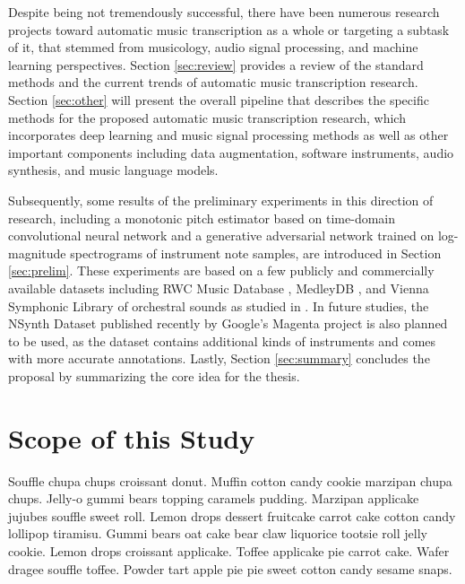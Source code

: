 Despite being not tremendously successful, there have been numerous research projects toward automatic music transcription as a whole or targeting a subtask of it, that stemmed from musicology, audio signal processing, and machine learning perspectives.
Section \ref{sec:review} provides a review of the standard methods and the current trends of automatic music transcription research.
Section \ref{sec:other} will present the overall pipeline that describes the specific methods for the proposed automatic music transcription research, which incorporates deep learning and music signal processing methods as well as other important components including data augmentation, software instruments, audio synthesis, and music language models.

Subsequently, some results of the preliminary experiments in this direction of research, including a monotonic pitch estimator based on time-domain convolutional neural network and a generative adversarial network trained on log-magnitude spectrograms of instrument note samples, are introduced in Section \ref{sec:prelim}.
These experiments are based on a few publicly and commercially available datasets including RWC Music Database \cite{goto2003rwc}, MedleyDB \cite{bittner2014medleydb}, and Vienna Symphonic Library of orchestral sounds as studied in \cite{humphrey2011nlse}.
In future studies, the NSynth Dataset published recently by Google's Magenta project \cite{engel2017nsynth} is also planned to be used, as the dataset contains additional kinds of instruments and comes with more accurate annotations.
Lastly, Section \ref{sec:summary} concludes the proposal by summarizing the core idea for the thesis.


\section{Scope of this Study}
\label{sec:scope}

Souffle chupa chups croissant donut. Muffin cotton candy cookie marzipan chupa chups. Jelly-o gummi bears topping caramels pudding. Marzipan applicake jujubes souffle sweet roll. Lemon drops dessert fruitcake carrot cake cotton candy lollipop tiramisu. Gummi bears oat cake bear claw liquorice tootsie roll jelly cookie. Lemon drops croissant applicake. Toffee applicake pie carrot cake. Wafer dragee souffle toffee. Powder tart apple pie pie sweet cotton candy sesame snaps.

